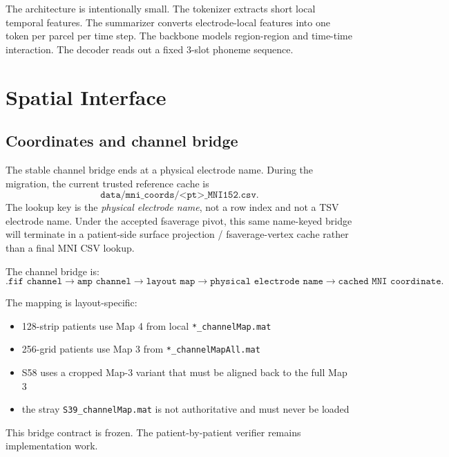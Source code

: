 \documentclass[11pt,letterpaper]{article}
\begin{document}
The architecture is intentionally small. The tokenizer extracts short local temporal features. The summarizer converts electrode-local features into one token per parcel per time step. The backbone models region-region and time-time interaction. The decoder reads out a fixed 3-slot phoneme sequence.


\section{Spatial Interface}

\subsection{Coordinates and channel bridge}

The stable channel bridge ends at a physical electrode name. During the migration, the current trusted reference cache is
\begin{equation}
\texttt{data/mni\_coords/<pt>\_MNI152.csv}.
\end{equation}
The lookup key is the \emph{physical electrode name}, not a row index and not a TSV electrode name. Under the accepted fsaverage pivot, this same name-keyed bridge will terminate in a patient-side surface projection / fsaverage-vertex cache rather than a final MNI CSV lookup.

The channel bridge is:
\begin{equation}
\texttt{.fif channel} \rightarrow \texttt{amp channel} \rightarrow \texttt{layout map}
\rightarrow \texttt{physical electrode name} \rightarrow \texttt{cached MNI coordinate}.
\end{equation}

The mapping is layout-specific:
\begin{itemize}[leftmargin=2em, itemsep=0.2em]
\item 128-strip patients use Map 4 from local \texttt{*\_channelMap.mat}
\item 256-grid patients use Map 3 from \texttt{*\_channelMapAll.mat}
\item S58 uses a cropped Map-3 variant that must be aligned back to the full Map 3
\item the stray \texttt{S39\_channelMap.mat} is not authoritative and must never be loaded
\end{itemize}

This bridge contract is frozen. The patient-by-patient verifier remains implementation work.
\end{document}
